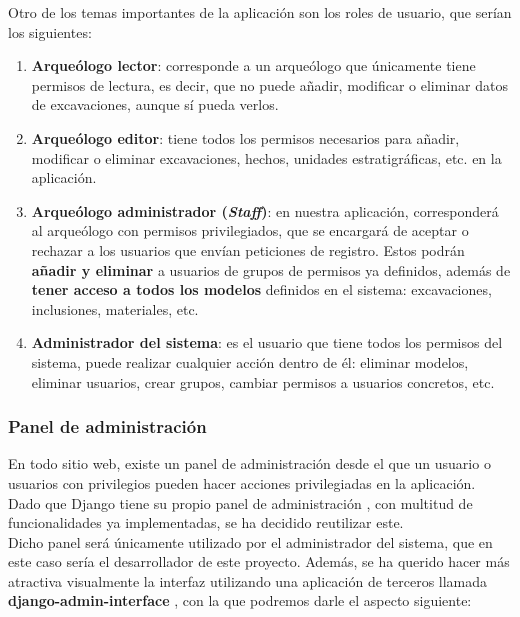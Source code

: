 Otro de los temas importantes de la aplicación son los roles de usuario, que serían los
siguientes:

    \begin{enumerate}
        \item \textbf{Arqueólogo lector}: corresponde a un arqueólogo que únicamente tiene
        permisos de lectura, es decir, que no puede añadir, modificar o eliminar
        datos de excavaciones, aunque sí pueda verlos.

        \item \textbf{Arqueólogo editor}: tiene todos los permisos necesarios para añadir,
        modificar o eliminar excavaciones, hechos, unidades estratigráficas, etc. en la
        aplicación.

        \item \textbf{Arqueólogo administrador (\textit{Staff})}: en nuestra aplicación,
        corresponderá al arqueólogo con permisos privilegiados, que se encargará de aceptar
        o rechazar a los usuarios que envían peticiones de registro. Estos podrán
        \textbf{añadir y eliminar} a usuarios de grupos de permisos ya definidos, además de
        \textbf{tener acceso a todos los modelos} definidos en el sistema: excavaciones,
        inclusiones, materiales, etc.

        \item \textbf{Administrador del sistema}: es el usuario que tiene todos los permisos
        del sistema, puede realizar cualquier acción dentro de él: eliminar modelos, eliminar
        usuarios, crear grupos, cambiar permisos a usuarios concretos, etc.
    \end{enumerate}

\subsubsection{Panel de administración}
En todo sitio web, existe un panel de administración desde el que un usuario o usuarios
con privilegios pueden hacer acciones privilegiadas en la aplicación. Dado que Django
tiene su propio panel de administración \cite{admin-panel}, con multitud de funcionalidades
ya implementadas, se ha decidido reutilizar este.\\

Dicho panel será únicamente utilizado por el administrador del sistema, que en este caso
sería el desarrollador de este proyecto. Además, se ha querido hacer más atractiva
visualmente la interfaz utilizando una aplicación de terceros llamada
\textbf{django-admin-interface} \cite{admin-interface}, con la que podremos darle el
aspecto siguiente:

